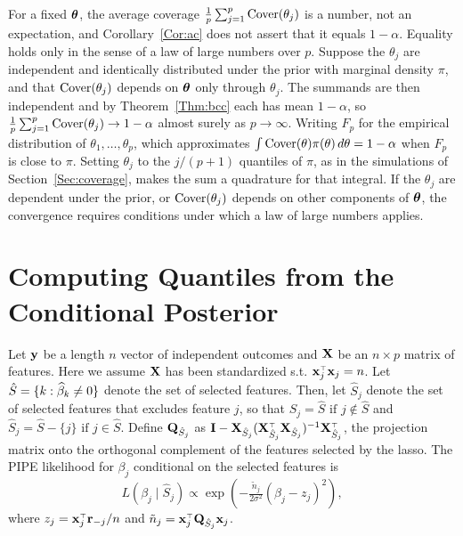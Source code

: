 \begin{rem}
  \label{Rem:ac}
  For a fixed $\boldsymbol{\theta}$, the average coverage $\tfrac{1}{p} \sum_{j=1}^p \textrm{Cover}(\theta_j)$ is a number, not an expectation, and Corollary~\ref{Cor:ac} does not assert that it equals $1-\alpha$. Equality holds only in the sense of a law of large numbers over $p$. Suppose the $\theta_j$ are independent and identically distributed under the prior with marginal density $\pi$, and that $\textrm{Cover}(\theta_j)$ depends on $\boldsymbol{\theta}$ only through $\theta_j$. The summands are then independent and by Theorem~\ref{Thm:bcc} each has mean $1-\alpha$, so $\tfrac{1}{p} \sum_{j=1}^p \textrm{Cover}(\theta_j) \to 1-\alpha$ almost surely as $p \to \infty$. Writing $F_p$ for the empirical distribution of $\theta_1, \ldots, \theta_p$,
  which approximates $\int \textrm{Cover}(\theta) \pi(\theta) \, d\theta = 1-\alpha$ when $F_p$ is close to $\pi$. Setting $\theta_j$ to the $j/(p+1)$ quantiles of $\pi$, as in the simulations of Section~\ref{Sec:coverage}, makes the sum a quadrature for that integral. If the $\theta_j$ are dependent under the prior, or $\textrm{Cover}(\theta_j)$ depends on other components of $\boldsymbol{\theta}$, the convergence requires conditions under which a law of large numbers applies.
\end{rem}

\clearpage

\section{Computing Quantiles from the Conditional Posterior}
\label{sup:A}

Let $\mathbf{y}$ be a length $n$ vector of independent outcomes and $\mathbf{X}$ be an $n \times p$ matrix of features. Here we assume $\mathbf{X}$ has been standardized s.t. $\mathbf{x}_j^{\scriptscriptstyle\top}\mathbf{x}_j = n$.  Let $\hat{S} = \lbrace k: \widehat{\beta}_k \neq  0 \rbrace$ denote the set of selected features. Then, let $\hat{S}_j$ denote the set of selected features that excludes feature $j$, so that $\hat{S}_j = \hat{S} \text{ if } j \notin \hat{S}$ and $\hat{S}_j = \hat{S} - \lbrace j \rbrace \text{ if } j \in \hat{S}$. Define $\mathbf{Q}_{\hat{S}_j}$ as $\mathbf{I} - \mathbf{X}_{\hat{S}_j}(\mathbf{X}_{\hat{S}_j}^{\scriptscriptstyle\top} \mathbf{X}_{\hat{S}_j})^{-1} \mathbf{X}_{\hat{S}_j}^{\scriptscriptstyle\top}$, the projection matrix onto the orthogonal complement of the features selected by the lasso. The PIPE likelihood for $\beta_j$ conditional on the selected features is
$$
L(\beta_j \mid \hat{S}_j) \propto \exp(-\tfrac{\tilde{n}_j}{2\sigma^2}(\beta_{j} - z_j)^2),
$$
\noindent where $z_j = \mathbf{x}_j ^{\scriptscriptstyle\top} \mathbf{r}_{-j}/n$ and $\tilde{n}_j = \mathbf{x}_j^{\scriptscriptstyle\top} \mathbf{Q}_{\hat{S}_j} \mathbf{x}_j$.

